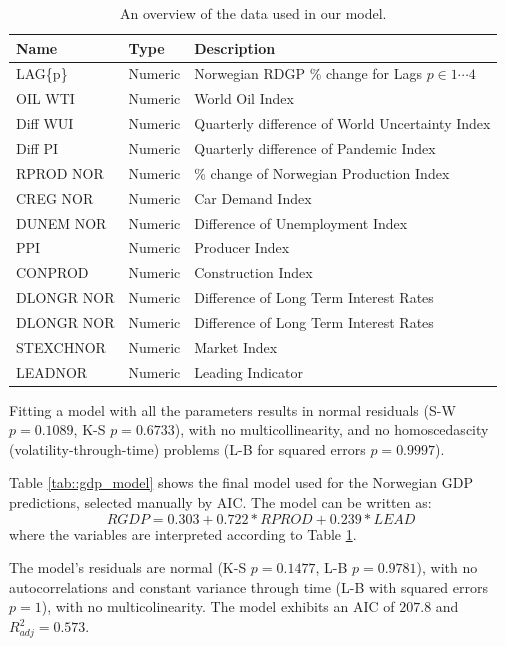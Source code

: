 \documentclass[11pt, a4paper]{article}
\begin{document}
	\begin{table}
		\centering
		\begin{tabular}
			{ |p{3cm} | p{3cm} | p{5cm}| }
			\hline
			\textbf{Name} & \textbf{Type} & \textbf{Description} \\
			\hline
			LAG\{p\}  & Numeric & Norwegian RDGP \% change for  Lags $p \in 1 \cdots 4$\\
			OIL WTI  & Numeric & World Oil Index \\
			Diff WUI  & Numeric & Quarterly difference of World Uncertainty Index \\
			Diff PI & Numeric & Quarterly difference of Pandemic Index \\
			RPROD NOR  & Numeric & \% change of Norwegian Production Index \\
			CREG NOR  & Numeric & Car Demand Index \\
			DUNEM NOR  & Numeric & Difference of Unemployment Index \\
			PPI  & Numeric & Producer Index \\
			CONPROD  & Numeric & Construction Index \\
			DLONGR NOR  & Numeric & Difference of Long Term Interest Rates\\
			DLONGR NOR  & Numeric & Difference of Long Term Interest Rates\\
			STEXCHNOR & Numeric & Market Index \\
			LEADNOR & Numeric & Leading Indicator \\
			\hline
		\end{tabular}
		\caption{An overview of the data used in our model.}
		\label{tab::params}
	\end{table}
	
	Fitting a model with all the parameters results in normal residuals (S-W $p = 0.1089$, K-S $p=0.6733$), with no multicollinearity, and no homoscedascity (volatility-through-time) problems (L-B for squared errors $p=0.9997$).
	
	Table \ref{tab::gdp_model} shows the final model used for the Norwegian GDP predictions, selected manually by AIC. The model can be written as:
	$$
	RGDP = 0.303 + 0.722 * RPROD + 0.239 * LEAD
	$$
	where the variables are interpreted according to Table \ref{tab::params}.
	
	The model's residuals are normal (K-S $p=0.1477$, L-B $p=0.9781$), with no autocorrelations and constant variance through time (L-B with squared errors $p=1$), with no multicolinearity. The model exhibits an AIC of $207.8$ and $R^2_{adj} = 0.573$.
	
	
	
	
	
	
	
\end{document}
